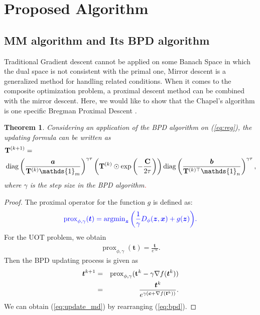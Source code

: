 \documentclass[conference]{IEEEtran}
\newtheorem{thm}{Theorem}
\newcommand{\one}{\mathds{1}}
\newcommand{\mat}[1]{\mathbf{#1}}
\renewcommand{\vec}[1]{\bm{#1}}
\newcommand{\prox}{\operatorname{prox}}
\newcommand{\argmin}{\operatorname{argmin}}
\newcommand{\changeHK}[1]{\textcolor{red}{#1}}
\newcommand{\changeSX}[1]{\textcolor{blue}{#1}}
\begin{document}
\section{Proposed Algorithm}
\subsection{MM algorithm and Its BPD algorithm}
Traditional Gradient descent cannot be applied on some Banach Space in which the dual space is not consistent with the primal one, Mirror descent\cite{doi:10.1137/1027074, BECK2003167} is a generalized method for handling related conditions. When it comes to the composite optimization problem, a proximal descent method can be combined with the mirror descent. Here, we would like to show that the Chapel's algorithm is one specific Bregman Proximal Descent \cite{DBLP:journals/coap/HanzelyRX21}.


\begin{thm}
Considering an application of the BPD algorithm on (\ref{eq:reg}), the updating formula can be written as
\begin{align}
\label{eq:update_md}
&\mat{T}^{(k+1)}=\notag\\
&\operatorname{diag}\left(\frac{\vec a}{\mat{T}^{(k)} \one_m}\right)^{\gamma\tau}\left(\mat{T}^{(k)} \odot \exp \left(-\frac{\mat C}{2 \tau}\right)\right)
\operatorname{diag}\left(\frac{\vec{b}}{\mat{T}^{(k) \top} \one_n}\right)^{{\gamma\tau}},\notag\\
\end{align}
where $\gamma$ is the step size in the BPD algorithm\changeHK{.}
\end{thm}
\begin{proof}
The proximal operator for the function $g$ is defined as:
\begin{align*}
\changeSX{\prox_{\phi,\gamma}(\vec t) = \argmin_{\vec z}{\left(\frac{1}{\gamma}D_\phi(\vec z,\vec x)+g(\vec z)\right)}.}
\end{align*}
For the UOT problem, we obtain
\begin{align*}
\prox_{\phi,\gamma}(\vec t) = \frac{\vec t}{e^{{\gamma \vec c}}}.
\end{align*}
Then the BPD updating process is given as
\begin{eqnarray}
\label{eq:bpd}
\vec t^{k+1} &=& \prox_{\phi,\gamma}(\mat t^{k} - \gamma \nabla f(\vec t^{k})) \notag\\
&=& \frac{\vec t^{k}}{e^{\gamma ({\vec c + \nabla f(\vec t^{k})})}}.
\end{eqnarray}
We can obtain (\ref{eq:update_md}) by rearranging (\ref{eq:bpd}).
\end{proof}
\end{document}
